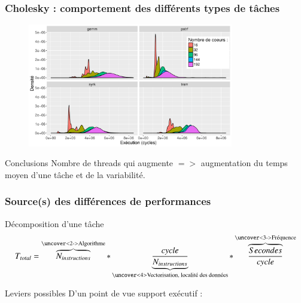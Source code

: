 \documentclass[xcolor={usenames,dvipsnames,svgnames,table}, aspectratio=43]{beamer}
\begin{document}
\begin{frame}
\frametitle{Cholesky : comportement des différents types de tâches}
\begin{figure}
  \includegraphics[width=0.8\textwidth]{graph/graph_distrib_overview_8192_224.pdf}
\end{figure}
 {
  \begin{block}{Conclusions}
    Nombre de threads qui augmente $=>$ augmentation du temps moyen d'une tâche et de la variabilité.
  \end{block}
}
\end{frame}


\begin{frame}
  \frametitle{Source(s) des différences de performances}

  \begin{block}{Décomposition d'une tâche}
    $$ T_{total} = \overbrace{N_{instructions}}^\text{\uncover<2->{Algorithme}} * \underbrace{\frac{cycle}{N_{instructions}}}_\text{\uncover<4>{Vectorisation, localité des données}} * \overbrace{\frac{Secondes}{cycle}}^\text{\uncover<3->{Fréquence}} $$
  \end{block}

  \begin{block}{Leviers possibles}
    D'un point de vue support exécutif :
    \begin{itemize}
    \end{itemize}
  \end{block}

\end{frame}
\end{document}

